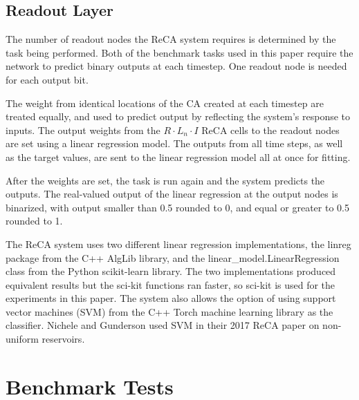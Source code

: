 \documentclass{elsarticle}
\begin{document}
\begin{multicols}{2}
\subsection{Readout Layer}
The number of readout nodes the ReCA system requires is determined by the task 
being  performed. Both of the benchmark tasks used in this paper require the 
network to predict binary outputs at each timestep. One readout node is needed 
for each output bit. \par The weight from identical locations of the CA created 
   at each timestep are treated equally, and used to predict output by 
      reflecting the system's response to inputs. The output weights from the 
      $R \cdot L_{n} \cdot I$ ReCA cells to the readout nodes are set using a 
      linear regression model.  The outputs from all time steps, as well as the 
      target values, are sent to the linear regression model all at once for 
      fitting.  \par
After the weights are set, the task is run again and the system predicts the 
outputs. The real-valued output of the linear regression at the output nodes is 
binarized, with output smaller than 0.5 rounded to 0, and equal or greater to 
0.5 rounded to 1. \par The ReCA system uses two different linear regression 
implementations, the linreg package from the C++ AlgLib library, and the 
linear\_model.LinearRegression class from the Python scikit-learn library.  The 
two implementations produced equivalent results but the sci-kit functions ran 
faster, so sci-kit is used for the experiments in this paper. The system also 
allows the option of  using support vector machines (SVM) from the C++ Torch 
machine learning library as the classifier.  Nichele and 
Gunderson used SVM in their 2017 ReCA paper on non-uniform 
reservoirs\cite{nichele2017reservoir}.

\section{Benchmark Tests}\label{Benchmarks}

\end{multicols}
\end{document}
